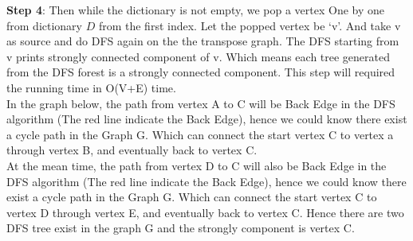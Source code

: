 \documentclass{article}
\begin{document}
\noindent \textbf{Step 4}: Then while the dictionary is not empty, we pop a vertex One by one from dictionary $D$ from the first index. Let the popped vertex be ‘v’. And take v as source and do DFS again on the the transpose graph. The DFS starting from v prints strongly connected component of v. Which means each tree generated from the DFS forest is a strongly connected component. This step will required the running time in O(V+E) time.\\

\noindent In the graph below, the path from vertex A to C will be Back Edge in the DFS algorithm (The red line indicate the Back Edge), hence we could know there exist a cycle path in the Graph G. Which can connect the start vertex C to vertex a through  vertex B, and eventually back to vertex C. \\

\noindent At the mean time, the path from vertex D to C will also be Back Edge in the DFS algorithm (The red line indicate the Back Edge), hence we could know there exist a cycle path in the Graph G. Which can connect the start vertex C to vertex D through vertex E, and eventually back to vertex C. Hence there are two DFS tree exist in the graph G and the strongly component is vertex C.

\begin{center}
\end{center}
\end{document}
